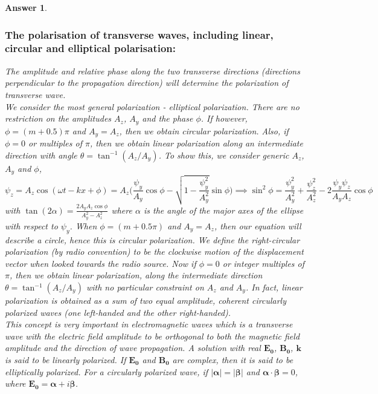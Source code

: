 \documentclass[a4paper]{article}
\newtheorem{ans}{Answer}[subsection]
\theoremstyle{new}
\begin{document}
\begin{ans}
\subsubsection*{The polarisation of transverse waves, including linear, circular and elliptical polarisation:}
The amplitude and relative phase along the two transverse directions (directions perpendicular to the propagation direction) will determine the polarization of transverse wave.\\[5pt]
We consider the most general polarization - elliptical polarization. There are no restriction on the amplitudes $A_z$, $A_y$ and the phase $\phi$. If however, $\phi=(m+0.5)\pi$ and $A_y=A_z$, then we obtain circular polarization. Also, if $\phi=0$ or multiples of $\pi$, then we obtain linear polarization along an intermediate direction with angle $\theta=\tan^{-1}(A_z/A_y)$. To show this, we consider generic $A_z$, $A_y$ and $\phi$,
$$\psi_z=A_z\cos(\omega t-kx+\phi)=A_z\bigg(\frac{\psi_y}{A_y}\cos\phi-\sqrt{1-\frac{\psi_y^2}{A_y^2}}\sin\phi\bigg)\implies\sin^2\phi=\frac{\psi_y^2}{A_y^2}+\frac{\psi_z^2}{A_z^2}-2\frac{\psi_y\psi_z}{A_yA_z}\cos\phi$$
with $\tan(2\alpha)=\frac{2A_yA_z\cos\phi}{A_y^2-A_z^2}$ where $\alpha$ is the angle of the major axes of the ellipse with respect to $\psi_y$. When $\phi=(m+0.5\pi)$ and $A_y=A_z$, then our equation will describe a circle, hence this is circular polarization. We define the right-circular polarization (by radio convention) to be the clockwise motion of the displacement vector when looked towards the radio source. Now if $\phi=0$ or integer multiples of $\pi$, then we obtain linear polarization, along the intermediate direction $\theta=\tan^{-1}(A_z/A_y)$ with no particular constraint on $A_z$ and $A_y$. In fact, linear polarization is obtained as a sum of two equal amplitude, coherent circularly polarized waves (one left-handed and the other right-handed).\\[5pt]
This concept is very important in electromagnetic waves which is a transverse wave with the electric field amplitude to be orthogonal to both the magnetic field amplitude and the direction of wave propagation. A solution with real $\mathbf{E_0}$, $\mathbf{B_0}$, $\mathbf{k}$ is said to be linearly polarized. If $\mathbf{E_0}$ and $\mathbf{B_0}$ are complex, then it is said to be elliptically polarized. For a circularly polarized wave, if $|\boldsymbol{\alpha}| = |\boldsymbol{\beta}|$ and $\boldsymbol{\alpha}\cdot\boldsymbol{\beta}=0$, where $\mathbf{E_0}=\boldsymbol{\alpha}+i\boldsymbol{\beta}$.
\end{ans}
\newpage
\end{document}
